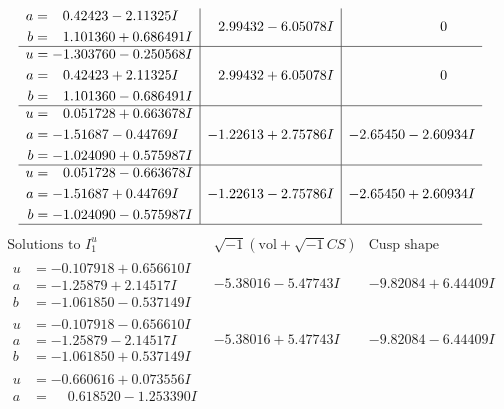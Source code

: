 \documentclass[1p]{elsarticle_modified}
\theoremstyle{definition}
\newcommand{\I}{\sqrt{-1}}
\begin{document}
$$\begin{array}{c|c|c}
\begin{aligned}
a &= \phantom{-}0.42423 - 2.11325 I \\
b &= \phantom{-}1.101360 + 0.686491 I\end{aligned}
 & \phantom{-}2.99432 - 6.05078 I & \phantom{-0.000000 } 0 \\ \hline\begin{aligned}
u &= -1.303760 - 0.250568 I \\
a &= \phantom{-}0.42423 + 2.11325 I \\
b &= \phantom{-}1.101360 - 0.686491 I\end{aligned}
 & \phantom{-}2.99432 + 6.05078 I & \phantom{-0.000000 } 0 \\ \hline\begin{aligned}
u &= \phantom{-}0.051728 + 0.663678 I \\
a &= -1.51687 - 0.44769 I \\
b &= -1.024090 + 0.575987 I\end{aligned}
 & -1.22613 + 2.75786 I & -2.65450 - 2.60934 I \\ \hline\begin{aligned}
u &= \phantom{-}0.051728 - 0.663678 I \\
a &= -1.51687 + 0.44769 I \\
b &= -1.024090 - 0.575987 I\end{aligned}
 & -1.22613 - 2.75786 I & -2.65450 + 2.60934 I\\
 \hline 
 \end{array}$$\newpage$$\begin{array}{c|c|c}  
\text{Solutions to }I^u_{1}& \I (\text{vol} + \sqrt{-1}CS) & \text{Cusp shape}\\
 \hline 
\begin{aligned}
u &= -0.107918 + 0.656610 I \\
a &= -1.25879 + 2.14517 I \\
b &= -1.061850 - 0.537149 I\end{aligned}
 & -5.38016 - 5.47743 I & -9.82084 + 6.44409 I \\ \hline\begin{aligned}
u &= -0.107918 - 0.656610 I \\
a &= -1.25879 - 2.14517 I \\
b &= -1.061850 + 0.537149 I\end{aligned}
 & -5.38016 + 5.47743 I & -9.82084 - 6.44409 I \\ \hline\begin{aligned}
u &= -0.660616 + 0.073556 I \\
a &= \phantom{-}0.618520 - 1.253390 I \\

\end{aligned}
\end{array}$$
\end{document}
